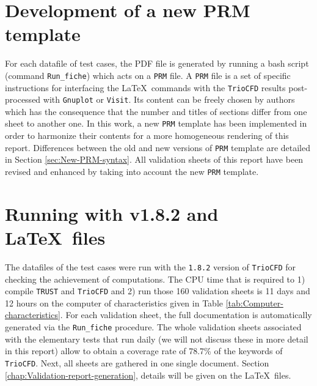 \section{Development of a new \textsf{PRM} template}
For each datafile of test cases, the PDF file is generated by running
a bash script (command \texttt{Run\_fiche}) which acts on a \texttt{PRM}
file. A \texttt{PRM} file is a set of specific instructions for interfacing
the \LaTeX ~commands with the \texttt{TrioCFD} results post-processed
with \texttt{Gnuplot} or \texttt{Visit}. Its content can be freely
chosen by authors which has the consequence that the number and titles
of sections differ from one sheet to another one. In this work, a
new \texttt{PRM} template has been implemented in order to harmonize
their contents for a more homogeneous rendering of this report. Differences
between the old and new versions of \texttt{PRM} template are detailed
in Section \ref{sec:New-PRM-syntax}. All validation sheets of this
report have been revised and enhanced by taking into account the new
\texttt{PRM} template.

\section{Running with \textsf{v1.8.2} and \LaTeX~files}
The datafiles of the test cases were run with the \texttt{1.8.2} version
of \texttt{TrioCFD} for checking the achievement of computations.
The CPU time that is required to 1) compile \texttt{TRUST} and \texttt{TrioCFD}
and 2) run those 160 validation sheets is 11 days and 12 hours on
the computer of characteristics given in Table \ref{tab:Computer-characteristics}.
For each validation sheet, the full documentation is automatically
generated via the \texttt{Run\_fiche} procedure. The whole validation
sheets associated with the elementary tests that run daily (we will
not discuss these in more detail in this report) allow to obtain a
coverage rate of 78.7\% of the keywords of \texttt{TrioCFD}. Next,
all sheets are gathered in one single document. Section \ref{chap:Validation-report-generation},
details will be given on the \LaTeX~files.

